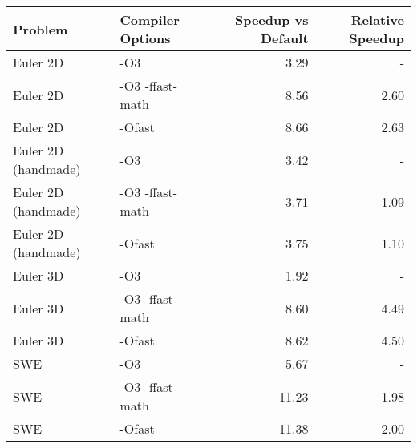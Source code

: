 \begin{tabular}{llrr}
\toprule
Problem & Compiler Options & Speedup vs Default & Relative Speedup \\
\midrule
Euler 2D & -O3 & 3.29 & - \\
Euler 2D & -O3 -ffast-math & 8.56 & 2.60 \\
Euler 2D & -Ofast & 8.66 & 2.63 \\
Euler 2D (handmade) & -O3 & 3.42 & - \\
Euler 2D (handmade) & -O3 -ffast-math & 3.71 & 1.09 \\
Euler 2D (handmade) & -Ofast & 3.75 & 1.10 \\
Euler 3D & -O3 & 1.92 & - \\
Euler 3D & -O3 -ffast-math & 8.60 & 4.49 \\
Euler 3D & -Ofast & 8.62 & 4.50 \\
SWE & -O3 & 5.67 & - \\
SWE & -O3 -ffast-math & 11.23 & 1.98 \\
SWE & -Ofast & 11.38 & 2.00 \\
\bottomrule
\end{tabular}
